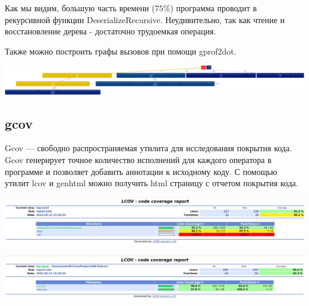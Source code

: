 \documentclass[12pt]{article}
\begin{document}
	Как мы видим, большую часть времени ($75\% $) программа проводит в рекурсивной функции DeserializeRecursive. Неудивительно, так как чтение и восстановление дерева - достаточно трудоемкая операция.
	
	\newpage
	
	Также можно построить графы вызовов при помощи gprof2dot.
	\begin{center}
		\includegraphics[width=\linewidth]{output.png}
	\end{center}

	\subsection*{gcov}
	
	Gcov — свободно распространяемая утилита для исследования покрытия кода. Gcov генерирует точное количество исполнений для каждого оператора в программе и позволяет добавить аннотации к исходному коду. 
	С помощью утилит lcov и genhtml можно получить html страницу с отчетом покрытия кода.
	\begin{center}
		\includegraphics[width=\linewidth]{gcov1.jpg}
	\end{center}
	\begin{center}
		\includegraphics[width=\linewidth]{gcov2.jpg}
	\end{center}
	
\end{document}
